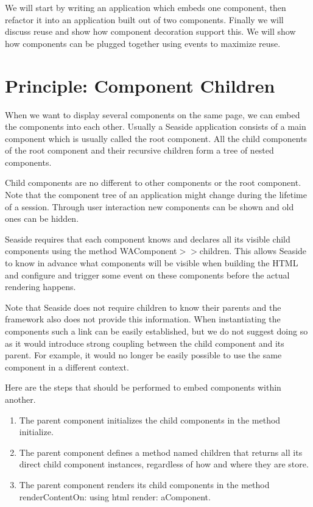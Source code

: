 \documentclass[a4paper,10pt,twoside]{book}
\newcommand{\ct}[1]{{\small\ttfamily\textup{#1}}}
\begin{document}
We will start by writing an application which embeds one component, then refactor it into an application built out of two components. Finally we will discuss reuse and show how component decoration support this. We will show how components can be plugged together using events to maximize reuse.

\section{Principle: Component Children}
\label{book:components:embedding:children}

When we want to display several components on the same page, we can embed the components into each other. Usually a Seaside application consists of a main component which is usually called the root component. All the child components of the root component and their recursive children form a tree of nested components.

Child components are no different to other components or the root component. Note that the component tree of an application might change during the lifetime of a session. Through user interaction new components can be shown and old ones can be hidden.

Seaside requires that each component knows and declares all its visible child components using the method \ct{WAComponent$>$$>$children}. This allows Seaside to know in advance what components will be visible when building the HTML and configure and trigger some event on these components before the actual rendering happens.

Note that Seaside does not require children to know their parents and the framework also does not provide this information. When instantiating the components such a link can be easily established, but we do not suggest doing so as it would introduce strong coupling between the child component and its parent. For example, it would no longer be easily possible to use the same component in a different context.

Here are the steps that should be performed to embed components within another.

\begin{enumerate}
\item  The parent component initializes the child components in the method \ct{initialize}.
\item  The parent component defines a method named \ct{children} that returns all its direct child component instances, regardless of how and where they are store.
\item  The parent component renders its child components in the method \ct{renderContentOn:} using \ct{html render: aComponent}.
\end{enumerate}
\end{document}
